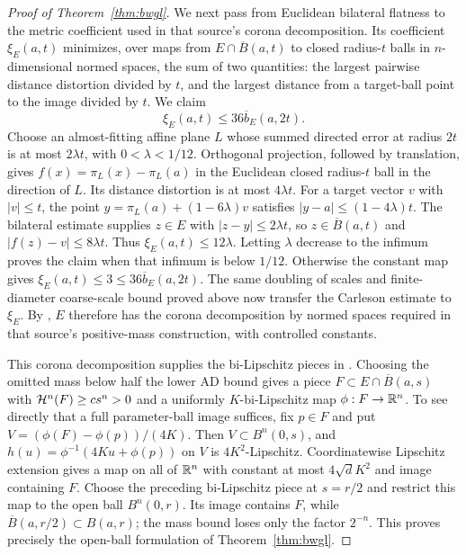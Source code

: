 \begin{proof}[Proof of Theorem~\ref{thm:bwgl}]
We next pass from Euclidean bilateral flatness to the metric coefficient
used in that source's corona decomposition. Its coefficient $\xi_E(a,t)$
\cite[Definition~3.1.3]{BateHydeSchul2023} minimizes, over maps from
$E\cap\overline B(a,t)$ to closed radius-$t$ balls in $n$-dimensional normed
spaces, the sum of two quantities: the largest pairwise distance
distortion divided by $t$, and the largest distance from a target-ball
point to the image divided by $t$. We claim
\[
 \xi_E(a,t)\leq36\overline b_E(a,2t).
\]
Choose an almost-fitting affine plane $L$ whose summed directed error
at radius $2t$ is at most $2\lambda t$, with $0<\lambda<1/12$.
Orthogonal projection, followed by translation, gives
$f(x)=\pi_L(x)-\pi_L(a)$ in the Euclidean closed radius-$t$ ball in the
direction of $L$. Its distance distortion is at most $4\lambda t$.
For a target vector $v$ with $|v|\leq t$, the point
$y=\pi_L(a)+(1-6\lambda)v$ satisfies
$|y-a|\leq(1-4\lambda)t$. The bilateral estimate supplies $z\in E$
with $|z-y|\leq2\lambda t$, so $z\in\overline B(a,t)$ and
$|f(z)-v|\leq8\lambda t$. Thus $\xi_E(a,t)\leq12\lambda$.
Letting $\lambda$ decrease to the infimum proves the claim when that
infimum is below $1/12$. Otherwise the constant map gives
$\xi_E(a,t)\leq3\leq36\overline b_E(a,2t)$.
The same doubling of scales and finite-diameter coarse-scale bound
proved above now transfer the Carleson estimate to $\xi_E$.
By \cite[Theorem~B, implication $(3)\Rightarrow(5)$]{BateHydeSchul2023},
$E$ therefore has the corona decomposition by normed spaces required
in that source's positive-mass construction, with controlled constants.

This corona decomposition supplies the bi-Lipschitz pieces in
\cite[Proposition~9.0.2 and Lemma~9.0.4]{BateHydeSchul2023}.
Choosing the omitted mass below half the lower AD bound gives a piece
$F\subset E\cap\overline B(a,s)$ with
$\mathcal H^n(F)\geq c s^n>0$ and a uniformly $K$-bi-Lipschitz map
$\phi:F\to\mathbb R^n$.
To see directly that a full parameter-ball image suffices, fix $p\in F$
and put $V=(\phi(F)-\phi(p))/(4K)$. Then
$V\subset B^n(0,s)$, and
$h(u)=\phi^{-1}(4Ku+\phi(p))$ on $V$ is $4K^2$-Lipschitz.
Coordinatewise Lipschitz extension gives a map on all of $\mathbb R^n$ with
constant at most $4\sqrt d K^2$ and image containing $F$.
Choose the preceding bi-Lipschitz piece at $s=r/2$ and restrict this map to the open ball
$B^n(0,r)$. Its image contains $F$, while
$\overline B(a,r/2)\subset B(a,r)$; the mass bound loses only the
factor $2^{-n}$. This proves precisely the open-ball formulation of
Theorem~\ref{thm:bwgl}.
\end{proof}
